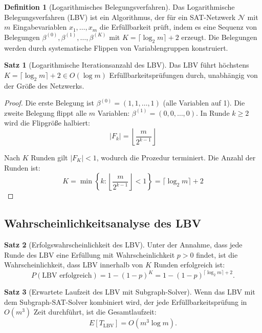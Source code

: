 ﻿\documentclass[a4paper,12pt]{article}
\theoremstyle{definition}
\newtheorem{definition}{Definition}
\newtheorem{satz}{Satz}
\begin{document}
\begin{definition}[Logarithmisches Belegungsverfahren]
Das Logarithmische Belegungsverfahren (LBV) ist ein Algorithmus, der für ein SAT-Netzwerk $\mathcal{N}$ mit $m$ Eingabevariablen $x_1, \ldots, x_m$ die Erfüllbarkeit prüft, indem es eine Sequenz von Belegungen $\beta^{(0)}, \beta^{(1)}, \ldots, \beta^{(K)}$ mit $K = \lceil \log_2 m \rceil + 2$ erzeugt. Die Belegungen werden durch systematische Flippen von Variablengruppen konstruiert.
\end{definition}

\begin{satz}[Logarithmische Iterationsanzahl des LBV]
\label{satz:lbv-iterations}
Das LBV führt höchstens $K = \lceil \log_2 m \rceil + 2 \in O(\log m)$ Erfüllbarkeitsprüfungen durch, unabhängig von der Größe des Netzwerks.
\end{satz}

\begin{proof}
Die erste Belegung ist $\beta^{(0)} = (1, 1, \ldots, 1)$ (alle Variablen auf 1). Die zweite Belegung flippt alle $m$ Variablen: $\beta^{(1)} = (0, 0, \ldots, 0)$. In Runde $k \geq 2$ wird die Flipgröße halbiert:
\[
|F_k| = \left\lfloor \frac{m}{2^{k-1}} \right\rfloor
\]

Nach $K$ Runden gilt $|F_K| < 1$, wodurch die Prozedur terminiert. Die Anzahl der Runden ist:
\[
K = \min\left\{ k : \left\lfloor \frac{m}{2^{k-1}} \right\rfloor < 1 \right\} = \lceil \log_2 m \rceil + 2
\]
\end{proof}

\subsection{Wahrscheinlichkeitsanalyse des LBV}

\begin{satz}[Erfolgswahrscheinlichkeit des LBV]
\label{satz:lbv-success}
Unter der Annahme, dass jede Runde des LBV eine Erfüllung mit Wahrscheinlichkeit $p > 0$ findet, ist die Wahrscheinlichkeit, dass LBV innerhalb von $K$ Runden erfolgreich ist:
\[
P(\text{LBV erfolgreich}) = 1 - (1-p)^K = 1 - (1-p)^{\lceil \log_2 m \rceil + 2}.
\]
\end{satz}

\begin{satz}[Erwartete Laufzeit des LBV mit Subgraph-Solver]
\label{satz:lbv-laufzeit}
Wenn das LBV mit dem Subgraph-SAT-Solver kombiniert wird, der jede Erfüllbarkeitsprüfung in $O(m^3)$ Zeit durchführt, ist die Gesamtlaufzeit:
\[
E[T_{\text{LBV}}] = O(m^3 \log m).
\]
\end{satz}
\end{document}
